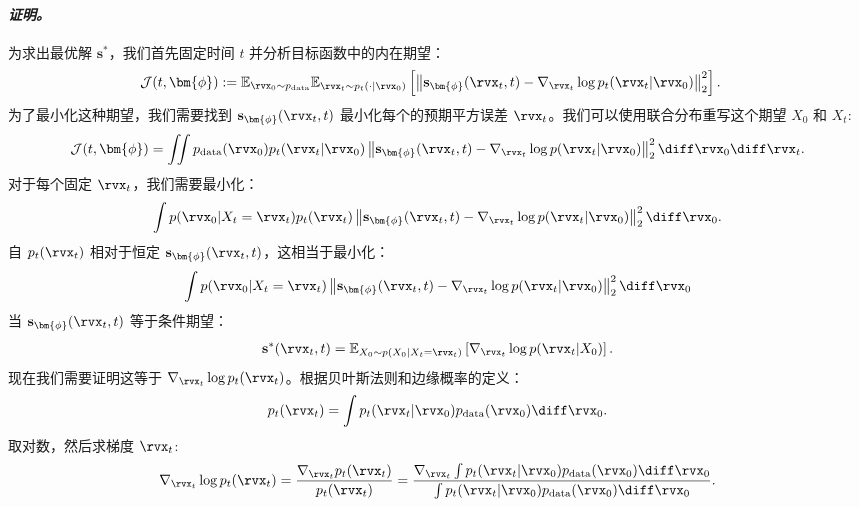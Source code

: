\paragraph{\textit{证明。}} 为求出最优解 $\mathbf{s}^*$，我们首先固定时间 $t$ 并分析目标函数中的内在期望：
\begin{align*}
\mathcal  J(t, \bm{\phi})
&:= \mathbb{E}_{\rvx_0 \sim p_{\text{data}}}
\mathbb{E}_{\rvx_t \sim p_t(\cdot|\rvx_0)}
\left[\left\| \mathbf{s}_{\bm{\phi}}(\rvx_t, t) - \nabla_{\rvx_t} \log p_t(\rvx_t|\rvx_0) \right\|_2^2 \right].
\end{align*}
为了最小化这种期望，我们需要找到
$\mathbf{s}_{\bm{\phi}}(\rvx_t, t)$
最小化每个的预期平方误差 $\rvx_t$。我们可以使用联合分布重写这个期望 $X_0$ 和 $X_t$:
\begin{align*}
\mathcal J(t, \bm{\phi})
= \iint p_{\text{data}}(\rvx_0) p_t(\rvx_t |\rvx_0)
\left\| \mathbf{s}_{\bm{\phi}}(\rvx_t, t) - \nabla_{\rvx_t} \log p(\rvx_t |  \rvx_0) \right\|_2^2
 \diff\rvx_0  \diff\rvx_t.
\end{align*}
对于每个固定 $\rvx_t$，我们需要最小化：
\begin{align*}
\int p(\rvx_0 | X_t = \rvx_t) p_t( \rvx_t)
\left\| \mathbf{s}_{\bm{\phi}}(\rvx_t, t) - \nabla_{\rvx_t} \log p(\rvx_t |  \rvx_0) \right\|_2^2
 \diff\rvx_0.
\end{align*}
自 $p_t(\rvx_t)$ 相对于恒定
$\mathbf{s}_{\bm{\phi}}(\rvx_t, t)$，这相当于最小化：
\begin{align*}
\int p( \rvx_0 | X_t = \rvx_t)
\left\| \mathbf{s}_{\bm{\phi}}(\rvx_t, t) - \nabla_{\rvx_t} \log p(\rvx_t |  \rvx_0) \right\|_2^2
  \diff\rvx_0
\end{align*}
当 $\mathbf{s}_{\bm{\phi}}(\rvx_t, t)$ 等于条件期望：
\begin{align*}
\mathbf{s}^*(\rvx_t, t)
= \mathbb{E}_{X_0 \sim p(X_0 | X_t = \rvx_t)}
\left[ \nabla_{\rvx_t} \log p(\rvx_t | X_0) \right].
\end{align*}
现在我们需要证明这等于
$\nabla_{\rvx_t} \log p_t(\rvx_t)$。根据贝叶斯法则和边缘概率的定义：
\begin{align*}
p_t(\rvx_t)
= \int p_t(\rvx_t | \rvx_0)
p_{\text{data}}(\rvx_0)   \diff\rvx_0.
\end{align*}
取对数，然后求梯度 $\rvx_t$:
\begin{align*}
\nabla_{\rvx_t} \log p_t(\rvx_t)
= \frac{\nabla_{\rvx_t} p_t(\rvx_t)}{p_t(\rvx_t)}
= \frac{\nabla_{\rvx_t} \int p_t(\rvx_t | \rvx_0)
p_{\text{data}}(\rvx_0)   \diff\rvx_0}
{\int p_t(\rvx_t | \rvx_0)
p_{\text{data}}(\rvx_0)   \diff\rvx_0}.
\end{align*}
